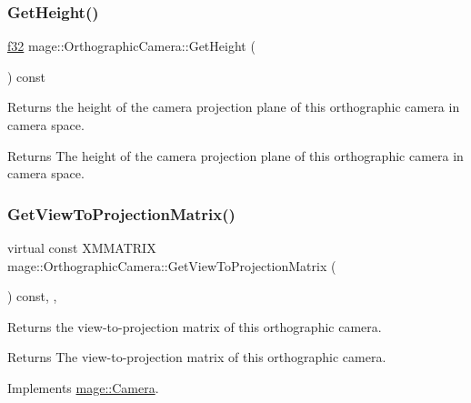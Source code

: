 \subsubsection{\texorpdfstring{Get\+Height()}{GetHeight()}}
{\footnotesize\ttfamily \hyperlink{namespacemage_a6a44ad388483959dc4dff9f2aef91431}{f32} mage\+::\+Orthographic\+Camera\+::\+Get\+Height (\begin{DoxyParamCaption}{ }\end{DoxyParamCaption}) const\hspace{0.3cm}{\ttfamily [noexcept]}}

Returns the height of the camera projection plane of this orthographic camera in camera space.

\begin{DoxyReturn}{Returns}
The height of the camera projection plane of this orthographic camera in camera space. 
\end{DoxyReturn}
\hypertarget{classmage_1_1_orthographic_camera_a1e8ea42a5df6dab1163b2c3938480f7c}{}\label{classmage_1_1_orthographic_camera_a1e8ea42a5df6dab1163b2c3938480f7c} 
\subsubsection{\texorpdfstring{Get\+View\+To\+Projection\+Matrix()}{GetViewToProjectionMatrix()}}
{\footnotesize\ttfamily virtual const X\+M\+M\+A\+T\+R\+IX mage\+::\+Orthographic\+Camera\+::\+Get\+View\+To\+Projection\+Matrix (\begin{DoxyParamCaption}{ }\end{DoxyParamCaption}) const\hspace{0.3cm}{\ttfamily [override]}, {\ttfamily [virtual]}, {\ttfamily [noexcept]}}

Returns the view-\/to-\/projection matrix of this orthographic camera.

\begin{DoxyReturn}{Returns}
The view-\/to-\/projection matrix of this orthographic camera. 
\end{DoxyReturn}


Implements \hyperlink{classmage_1_1_camera_ad3e8380ba9718a983f72d753d08f556e}{mage\+::\+Camera}.

\hypertarget{classmage_1_1_orthographic_camera_a62a3d61d2a28b2e90a83a0739d11129d}{}\label{classmage_1_1_orthographic_camera_a62a3d61d2a28b2e90a83a0739d11129d} 
